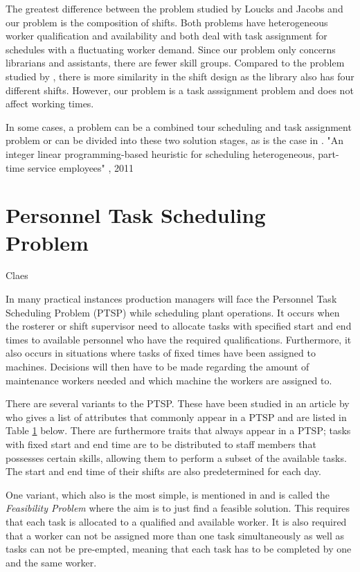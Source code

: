 The greatest difference between the problem studied by Loucks and Jacobs and our problem is the composition of shifts. Both problems have heterogeneous worker qualification and availability and both deal with task assignment for schedules with a fluctuating worker demand. Since our problem only concerns librarians and assistants, there are fewer skill groups. Compared to the problem studied by \cite{choi_hwang_park_2009}, there is more similarity in the shift design as the library also has four different shifts. However, our problem is a task asssignment problem and does not affect working times. 

In some cases, a problem can be a combined tour scheduling and task assignment problem or can be divided into these two solution stages, as is the case in \cite{keylist}. "An integer linear programming-based heuristic for scheduling heterogeneous, part-time service employees" , 2011


\section{Personnel Task Scheduling Problem} \label{PTSP}
Claes

In many practical instances production managers will face the Personnel Task Scheduling Problem (PTSP) while scheduling plant operations. It occurs when the rosterer or shift supervisor need to allocate tasks with specified start and end times to available personnel who have the required qualifications. Furthermore, it also occurs in situations where tasks of fixed times have been assigned to machines. Decisions will then have to be made regarding the amount of maintenance workers needed and which machine the workers are assigned to. \cite{krishnamoorthy_2001}

There are several variants to the PTSP. These have been studied in an article by \cite{krishnamoorthy_2001} who gives a list of attributes that commonly appear in a PTSP and are listed in Table \ref{PTSP} below. There are furthermore traits that always appear in a PTSP; tasks with fixed start and end time are to be distributed to staff members that possesses certain skills, allowing them to perform a subset of the available tasks. The start and end time of their shifts are also predetermined for each day.

One variant, which also is the most simple, is mentioned in \cite{krishnamoorthy_2001} and is called the \textit{Feasibility Problem} where the aim is to just find a feasible solution. This requires that each task is allocated to a qualified and available worker. It is also required that a worker can not be assigned more than one task simultaneously as well as tasks can not be pre-empted, meaning that each task has to be completed by one and the same worker.

